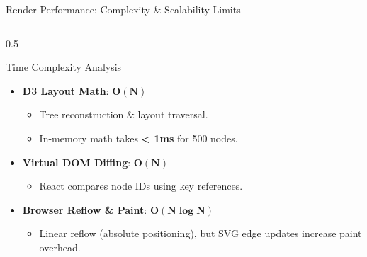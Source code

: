 \documentclass[aspectratio=169, 10pt]{beamer}
\begin{document}
\begin{frame}{Render Performance: Complexity \& Scalability Limits}
  \begin{columns}
    \begin{column}{0.5\textwidth}
      \begin{block}{Time Complexity Analysis}
        \begin{itemize}
          \item[\textcolor{axonpurple}{\tiny$\blacksquare$}] \textbf{D3 Layout Math}: $\mathbf{O(N)}$
            \begin{itemize}
              \item Tree reconstruction \& layout traversal.
              \item In-memory math takes \textbf{< 1ms} for 500 nodes.
            \end{itemize}
          \vspace{0.2em}
          \item[\textcolor{axonpurple}{\tiny$\blacksquare$}] \textbf{Virtual DOM Diffing}: $\mathbf{O(N)}$
            \begin{itemize}
              \item React compares node IDs using key references.
            \end{itemize}
          \vspace{0.2em}
          \item[\textcolor{axonpurple}{\tiny$\blacksquare$}] \textbf{Browser Reflow \& Paint}: $\mathbf{O(N \log N)}$
            \begin{itemize}
              \item Linear reflow (absolute positioning), but SVG edge updates increase paint overhead.
            \end{itemize}
        \end{itemize}
      \end{block}
    \end{column}
    

\end{columns}
\end{frame}
\end{document}

